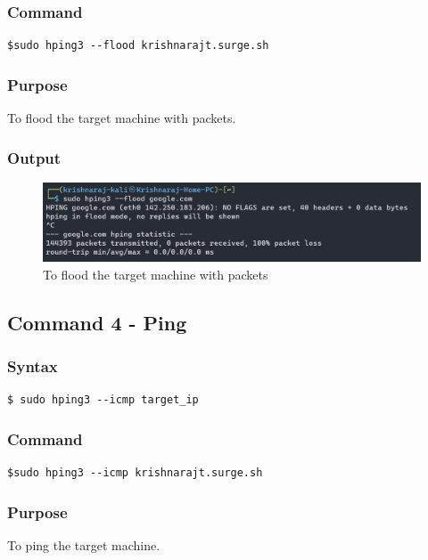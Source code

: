 \documentclass[11pt]{article}
\begin{document}
\subsubsection*{Command}
\begin{verbatim}
$sudo hping3 --flood krishnarajt.surge.sh
\end{verbatim}

\subsubsection*{Purpose}
To flood the target machine with packets.

\subsubsection*{Output}
\begin{figure}[H]
    \centering
    \includegraphics[width=1.0\textwidth]{hping/hping flood.jpg}
    \caption{To flood the target machine with packets}
    \label{fig:3}
\end{figure}

\subsection{Command 4 - Ping}

\subsubsection*{Syntax}
\begin{verbatim}
$ sudo hping3 --icmp target_ip
\end{verbatim}

\subsubsection*{Command}
\begin{verbatim}
$sudo hping3 --icmp krishnarajt.surge.sh
\end{verbatim}

\subsubsection*{Purpose}
To ping the target machine.
\end{document}
